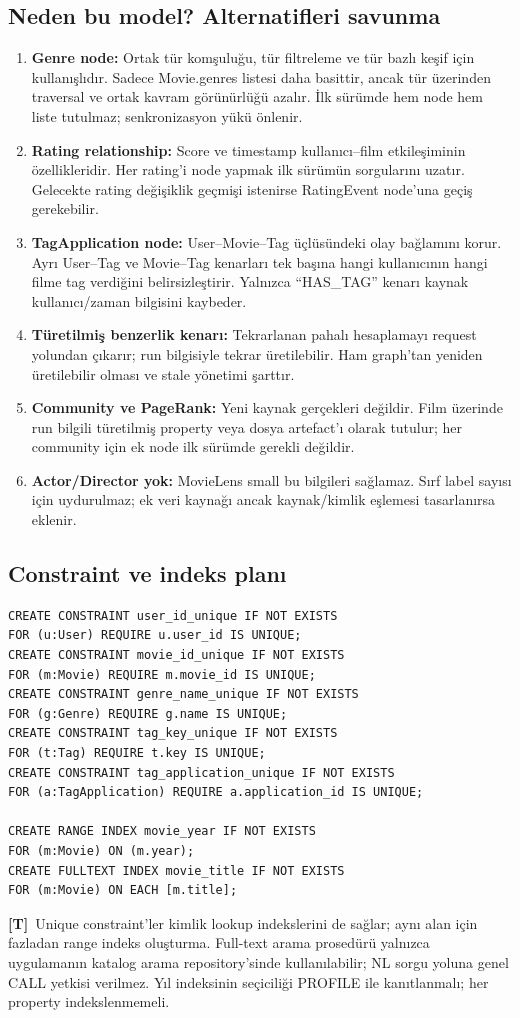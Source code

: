 \documentclass[11pt,a4paper]{article}
\newcommand{\design}{\textbf{[T]}}
\begin{document}
\subsection{Neden bu model? Alternatifleri savunma}
\begin{enumerate}
\item \textbf{Genre node:} Ortak tür komşuluğu, tür filtreleme ve tür bazlı keşif için kullanışlıdır. Sadece Movie.genres listesi daha basittir, ancak tür üzerinden traversal ve ortak kavram görünürlüğü azalır. İlk sürümde hem node hem liste tutulmaz; senkronizasyon yükü önlenir.
\item \textbf{Rating relationship:} Score ve timestamp kullanıcı--film etkileşiminin özellikleridir. Her rating'i node yapmak ilk sürümün sorgularını uzatır. Gelecekte rating değişiklik geçmişi istenirse RatingEvent node'una geçiş gerekebilir.
\item \textbf{TagApplication node:} User--Movie--Tag üçlüsündeki olay bağlamını korur. Ayrı User--Tag ve Movie--Tag kenarları tek başına hangi kullanıcının hangi filme tag verdiğini belirsizleştirir. Yalnızca ``HAS\_TAG'' kenarı kaynak kullanıcı/zaman bilgisini kaybeder.
\item \textbf{Türetilmiş benzerlik kenarı:} Tekrarlanan pahalı hesaplamayı request yolundan çıkarır; run bilgisiyle tekrar üretilebilir. Ham graph'tan yeniden üretilebilir olması ve stale yönetimi şarttır.
\item \textbf{Community ve PageRank:} Yeni kaynak gerçekleri değildir. Film üzerinde run bilgili türetilmiş property veya dosya artefact'ı olarak tutulur; her community için ek node ilk sürümde gerekli değildir.
\item \textbf{Actor/Director yok:} MovieLens small bu bilgileri sağlamaz. Sırf label sayısı için uydurulmaz; ek veri kaynağı ancak kaynak/kimlik eşlemesi tasarlanırsa eklenir.
\end{enumerate}

\subsection{Constraint ve indeks planı}
\begin{lstlisting}
CREATE CONSTRAINT user_id_unique IF NOT EXISTS
FOR (u:User) REQUIRE u.user_id IS UNIQUE;
CREATE CONSTRAINT movie_id_unique IF NOT EXISTS
FOR (m:Movie) REQUIRE m.movie_id IS UNIQUE;
CREATE CONSTRAINT genre_name_unique IF NOT EXISTS
FOR (g:Genre) REQUIRE g.name IS UNIQUE;
CREATE CONSTRAINT tag_key_unique IF NOT EXISTS
FOR (t:Tag) REQUIRE t.key IS UNIQUE;
CREATE CONSTRAINT tag_application_unique IF NOT EXISTS
FOR (a:TagApplication) REQUIRE a.application_id IS UNIQUE;

CREATE RANGE INDEX movie_year IF NOT EXISTS
FOR (m:Movie) ON (m.year);
CREATE FULLTEXT INDEX movie_title IF NOT EXISTS
FOR (m:Movie) ON EACH [m.title];
\end{lstlisting}
\design\ Unique constraint'ler kimlik lookup indekslerini de sağlar; aynı alan için fazladan range indeks oluşturma. Full-text arama prosedürü yalnızca uygulamanın katalog arama repository'sinde kullanılabilir; NL sorgu yoluna genel CALL yetkisi verilmez. Yıl indeksinin seçiciliği PROFILE ile kanıtlanmalı; her property indekslenmemeli.
\end{document}
